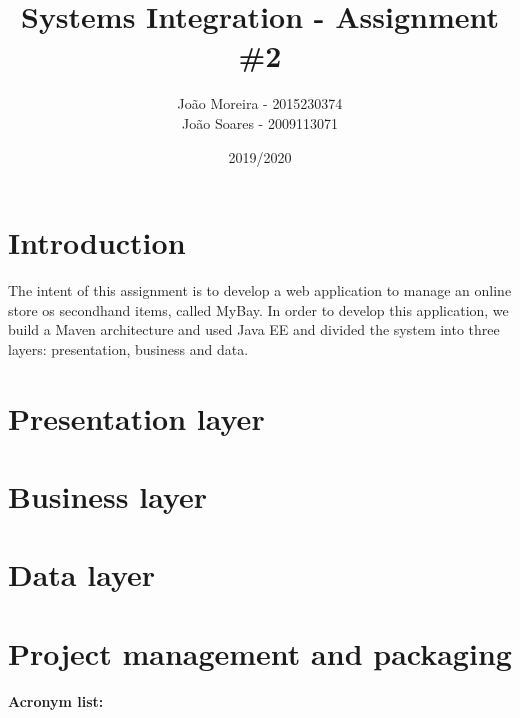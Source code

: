 \documentclass{article}
\title{Systems Integration - Assignment \#2}
\date{2019/2020}
\author{João Moreira - 2015230374 \\ 
João Soares - 2009113071 }
\begin{document}
\maketitle

\section{Introduction}

\qquad The intent of this assignment is to develop a web application to manage an online store os secondhand items, called MyBay. In order to develop this application, we build a Maven architecture and used \ac{Java EE} and divided the system into three layers: presentation, business and data.

\section{Presentation layer}

\qquad 

\section{Business layer}

\qquad 

\section{Data layer}

\qquad 

\section{Project management and packaging}

\qquad

\textbf{Acronym list:}

\begin{acronym}
\end{acronym}
\end{document}
